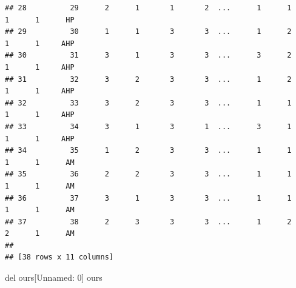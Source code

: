 \documentclass[
  10pt,
]{article}
\newenvironment{Shaded}{\begin{snugshade}}{\end{snugshade}}
\newcommand{\NormalTok}[1]{#1}
\begin{document}
\begin{verbatim}
## 28          29      2      1       1       2  ...      1      1      1      1      HP
## 29          30      1      1       3       3  ...      1      2      1      1     AHP
## 30          31      3      1       3       3  ...      3      2      1      1     AHP
## 31          32      3      2       3       3  ...      1      2      1      1     AHP
## 32          33      3      2       3       3  ...      1      1      1      1     AHP
## 33          34      3      1       3       1  ...      3      1      1      1     AHP
## 34          35      1      2       3       3  ...      1      1      1      1      AM
## 35          36      2      2       3       3  ...      1      1      1      1      AM
## 36          37      3      1       3       3  ...      1      1      1      1      AM
## 37          38      2      3       3       3  ...      1      2      2      1      AM
## 
## [38 rows x 11 columns]
\end{verbatim}

\begin{Shaded}
\begin{Highlighting}[]
\NormalTok{del ours[\textquotesingle{}Unnamed: 0\textquotesingle{}]}
\NormalTok{ours}
\end{Highlighting}
\end{Shaded}
\end{document}
